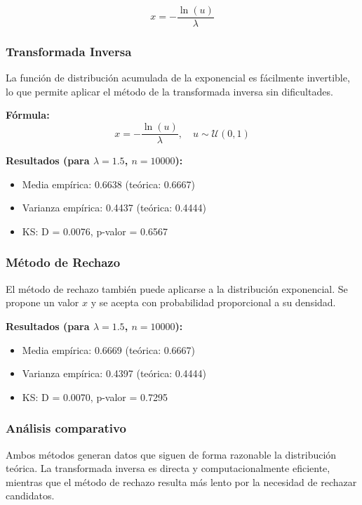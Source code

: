 \documentclass{article}
\begin{document}
\[
x = -\frac{\ln(u)}{\lambda}
\]

\subsubsection{Transformada Inversa}

La función de distribución acumulada de la exponencial es fácilmente invertible, lo que permite aplicar el método de la transformada inversa sin dificultades.

\textbf{Fórmula:}
\[
x = -\frac{\ln(u)}{\lambda}, \quad u \sim \mathcal{U}(0,1)
\]

\textbf{Resultados (para $\lambda=1.5$, $n=10000$):}

\begin{itemize}
  \item Media empírica: 0.6638 (teórica: 0.6667)
  \item Varianza empírica: 0.4437 (teórica: 0.4444)
  \item KS: D = 0.0076, p-valor = 0.6567
\end{itemize}

\subsubsection{Método de Rechazo}

El método de rechazo también puede aplicarse a la distribución exponencial. Se propone un valor $x$ y se acepta con probabilidad proporcional a su densidad.

\textbf{Resultados (para $\lambda=1.5$, $n=10000$):}

\begin{itemize}
  \item Media empírica: 0.6669 (teórica: 0.6667)
  \item Varianza empírica: 0.4397 (teórica: 0.4444)
  \item KS: D = 0.0070, p-valor = 0.7295
\end{itemize}



\subsubsection{Análisis comparativo}

Ambos métodos generan datos que siguen de forma razonable la distribución teórica. La transformada inversa es directa y computacionalmente eficiente, mientras que el método de rechazo resulta más lento por la necesidad de rechazar candidatos.
\end{document}
